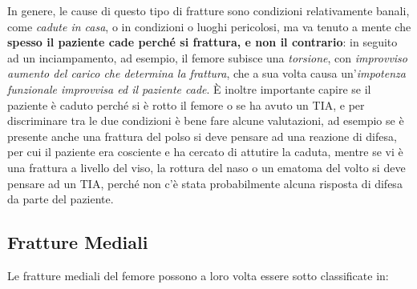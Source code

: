 In genere, le cause di questo tipo di fratture sono condizioni
relativamente banali, come \emph{cadute in casa}, o in condizioni o
luoghi pericolosi, ma va tenuto a mente che \textbf{spesso il paziente
cade perché si frattura, e non il contrario}: in seguito ad un
inciampamento, ad esempio, il femore subisce una \emph{torsione}, con
\emph{improvviso aumento del carico che determina la frattura}, che a
sua volta causa un'\emph{impotenza funzionale improvvisa ed il paziente
cade}. È inoltre importante capire se il paziente è caduto perché si è
rotto il femore o se ha avuto un TIA, e per discriminare tra le due
condizioni è bene fare alcune valutazioni, ad esempio se è presente
anche una frattura del polso si deve pensare ad una reazione di difesa,
per cui il paziente era cosciente e ha cercato di attutire la caduta,
mentre se vi è una frattura a livello del viso, la rottura del naso o un
ematoma del volto si deve pensare ad un TIA, perché non c'è stata
probabilmente alcuna risposta di difesa da parte del paziente.

\subsection{Fratture Mediali}


Le fratture mediali del femore possono a loro volta essere sotto
classificate in:


